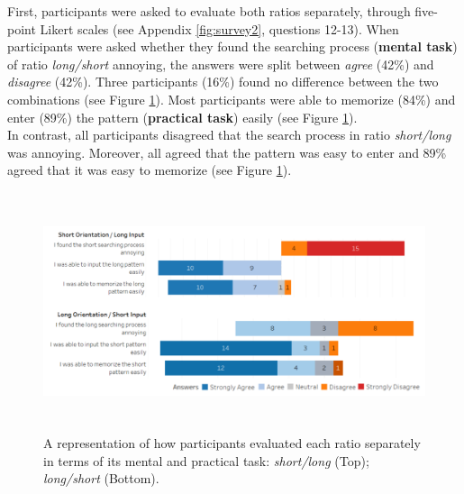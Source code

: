 First, participants were asked to evaluate both ratios separately, through five-point Likert scales (see Appendix \ref{fig:survey2}, questions 12-13). When participants were asked whether they found the searching process (\textbf{mental task}) of ratio \textit{long/short} annoying, the answers were split between \textit{agree} (42\%) and \textit{disagree} (42\%). Three participants (16\%) found no difference between the two combinations (see Figure \ref{fig:likert}). Most participants were able to memorize (84\%) and enter (89\%) the pattern (\textbf{practical task}) easily (see Figure \ref{fig:likert}). \\
In contrast, all participants disagreed that the search process in ratio \textit{short/long} was annoying. Moreover, all agreed that the pattern was easy to enter and 89\% agreed that it was easy to memorize (see Figure \ref{fig:likert}).\\
 
 \begin{figure}[t!]
\centering
\includegraphics[width=15cm, height=7cm]{Chapters/graphics/likert.PNG}
\caption{A representation of how participants evaluated each ratio separately in terms of its mental and practical task: \textit{short/long} (Top);  \textit{long/short} (Bottom).}
\label{fig:likert}
\end{figure}

